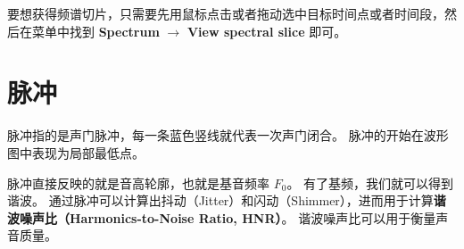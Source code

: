 要想获得频谱切片，只需要先用鼠标点击或者拖动选中目标时间点或者时间段，然后在菜单中找到 \textbf{Spectrum} $\rightarrow$ \textbf{View spectral slice} 即可。

\section{脉冲}
脉冲指的是声门脉冲，每一条蓝色竖线就代表一次声门闭合。
脉冲的开始在波形图中表现为局部最低点。

脉冲直接反映的就是音高轮廓，也就是基音频率 $F_0$。
有了基频，我们就可以得到谐波。
通过脉冲可以计算出抖动（Jitter）和闪动（Shimmer），进而用于计算\textbf{谐波噪声比（Harmonics-to-Noise Ratio, HNR）}。
谐波噪声比可以用于衡量声音质量。
